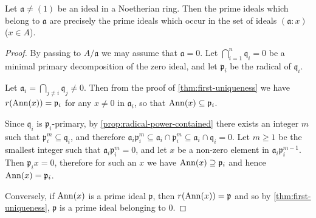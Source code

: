 \begin{proposition}\label{prop:associated-primes-annihilators}
Let $\mathfrak{a} \neq (1)$ be an ideal in a Noetherian ring. Then the prime ideals which belong to $\mathfrak{a}$ are precisely the prime ideals which occur in the set of ideals $(\mathfrak{a}:x)$ ($x \in A$).
\end{proposition}

\begin{proof}
By passing to $A/\mathfrak{a}$ we may assume that $\mathfrak{a} = 0$. Let $\bigcap_{i=1}^n \mathfrak{q}_i = 0$ be a minimal primary decomposition of the zero ideal, and let $\mathfrak{p}_i$ be the radical of $\mathfrak{q}_i$.

Let $\mathfrak{a}_i = \bigcap_{j \neq i} \mathfrak{q}_j \neq 0$. Then from the proof of \eqref{thm:first-uniqueness} we have $r(\operatorname{Ann}(x)) = \mathfrak{p}_i$ for any $x \neq 0$ in $\mathfrak{a}_i$, so that $\operatorname{Ann}(x) \subseteq \mathfrak{p}_i$.

Since $\mathfrak{q}_i$ is $\mathfrak{p}_i$-primary, by \eqref{prop:radical-power-contained} there exists an integer $m$ such that $\mathfrak{p}_i^m \subseteq \mathfrak{q}_i$, and therefore $\mathfrak{a}_i \mathfrak{p}_i^m \subseteq \mathfrak{a}_i \cap \mathfrak{p}_i^m \subseteq \mathfrak{a}_i \cap \mathfrak{q}_i = 0$. Let $m \geq 1$ be the smallest integer such that $\mathfrak{a}_i \mathfrak{p}_i^m = 0$, and let $x$ be a non-zero element in $\mathfrak{a}_i \mathfrak{p}_i^{m-1}$. Then $\mathfrak{p}_i x = 0$, therefore for such an $x$ we have $\operatorname{Ann}(x) \supseteq \mathfrak{p}_i$ and hence $\operatorname{Ann}(x) = \mathfrak{p}_i$.

Conversely, if $\operatorname{Ann}(x)$ is a prime ideal $\mathfrak{p}$, then $r(\operatorname{Ann}(x)) = \mathfrak{p}$ and so by \eqref{thm:first-uniqueness}, $\mathfrak{p}$ is a prime ideal belonging to $0$.
\end{proof}


